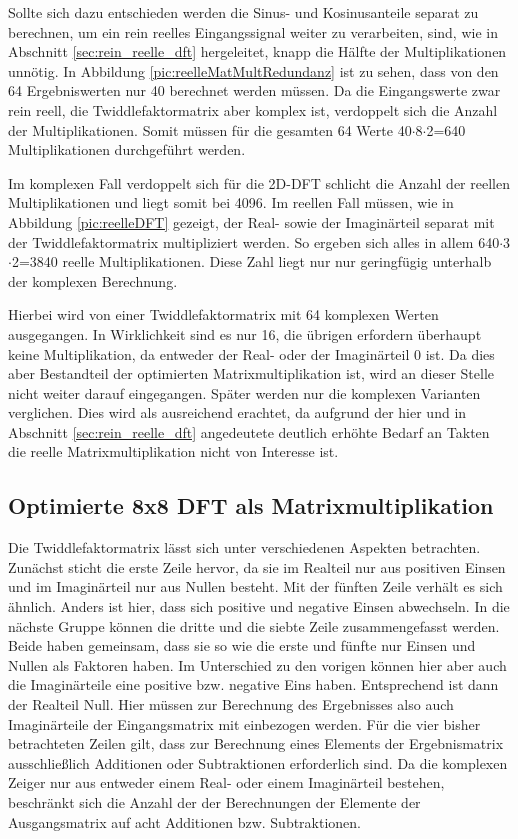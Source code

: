 Sollte sich dazu entschieden werden die Sinus- und Kosinusanteile separat zu berechnen, um ein rein reelles Eingangssignal weiter zu verarbeiten, sind, wie in Abschnitt
\ref{sec:rein_reelle_dft} hergeleitet, knapp die Hälfte der Multiplikationen unnötig. In Abbildung \ref{pic:reelleMatMultRedundanz} ist zu sehen, dass von den 64 
Ergebniswerten nur 40 berechnet werden müssen. Da die Eingangswerte zwar rein reell, die Twiddlefaktormatrix aber komplex ist, verdoppelt sich die Anzahl der Multiplikationen.
Somit müssen für die gesamten 64 Werte 40$\cdot$8$\cdot$2=640 Multiplikationen durchgeführt werden.

Im komplexen Fall verdoppelt sich für die 2D-DFT schlicht die Anzahl der reellen Multiplikationen und liegt somit bei 4096. Im reellen Fall müssen, wie in Abbildung 
\ref{pic:reelleDFT} gezeigt, der Real- sowie der Imaginärteil separat mit der Twiddlefaktormatrix multipliziert werden. So ergeben sich alles in allem 
640$\cdot$3$\cdot$2=3840 reelle Multiplikationen. Diese Zahl liegt nur nur geringfügig unterhalb der komplexen Berechnung.



Hierbei wird von einer Twiddlefaktormatrix mit 64 komplexen Werten ausgegangen. In Wirklichkeit sind es nur 16, die übrigen erfordern überhaupt keine Multiplikation, da 
entweder der Real- oder der Imaginärteil 0 ist. Da dies aber Bestandteil der optimierten Matrixmultiplikation ist, wird an dieser Stelle nicht weiter darauf eingegangen.
Später werden nur die komplexen Varianten verglichen. Dies wird als ausreichend erachtet, da aufgrund der hier und in Abschnitt \ref{sec:rein_reelle_dft} angedeutete deutlich 
erhöhte Bedarf an Takten die reelle Matrixmultiplikation nicht von Interesse ist. 


\subsection{Optimierte 8x8 DFT als Matrixmultiplikation}\label{sec:OptimierteMatrixmultiplikation}
Die Twiddlefaktormatrix lässt sich unter verschiedenen Aspekten betrachten.
Zunächst sticht die erste Zeile hervor, da sie im Realteil nur aus positiven Einsen und im Imaginärteil nur aus Nullen besteht.
Mit der fünften Zeile verhält es sich ähnlich. Anders ist hier, dass sich positive und negative Einsen abwechseln.
In die nächste Gruppe können die dritte und die siebte Zeile zusammengefasst werden. Beide haben gemeinsam, dass sie so wie die erste und fünfte nur Einsen und Nullen
als Faktoren haben. Im Unterschied zu den vorigen können hier aber auch die Imaginärteile eine positive bzw. negative Eins haben. Entsprechend ist dann der Realteil
Null. Hier müssen zur Berechnung des Ergebnisses also auch Imaginärteile der Eingangsmatrix mit einbezogen werden.
Für die vier bisher betrachteten Zeilen gilt, dass zur Berechnung eines Elements der Ergebnismatrix ausschließlich Additionen oder Subtraktionen erforderlich sind. 
Da die komplexen Zeiger nur aus entweder einem Real- oder einem Imaginärteil bestehen, beschränkt sich die Anzahl der der Berechnungen der Elemente der Ausgangsmatrix
auf acht Additionen bzw. Subtraktionen.

